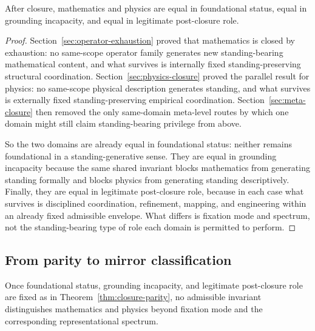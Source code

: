 \begin{theorem}
\label{thm:closure-parity}
After closure, mathematics and physics are equal in foundational status, equal in grounding incapacity, and equal in legitimate post-closure role.
\end{theorem}

\begin{proof}
Section~\ref{sec:operator-exhaustion} proved that mathematics is closed by exhaustion: no same-scope operator family generates new standing-bearing mathematical content, and what survives is internally fixed standing-preserving structural coordination. Section~\ref{sec:physics-closure} proved the parallel result for physics: no same-scope physical description generates standing, and what survives is externally fixed standing-preserving empirical coordination. Section~\ref{sec:meta-closure} then removed the only same-domain meta-level routes by which one domain might still claim standing-bearing privilege from above.

So the two domains are already equal in foundational status: neither remains foundational in a standing-generative sense. They are equal in grounding incapacity because the same shared invariant blocks mathematics from generating standing formally and blocks physics from generating standing descriptively. Finally, they are equal in legitimate post-closure role, because in each case what survives is disciplined coordination, refinement, mapping, and engineering within an already fixed admissible envelope. What differs is fixation mode and spectrum, not the standing-bearing type of role each domain is permitted to perform.
\end{proof}

\subsection{From parity to mirror classification}

\begin{proposition}
\label{prop:no-residual-invariant}
Once foundational status, grounding incapacity, and legitimate post-closure role are fixed as in Theorem~\ref{thm:closure-parity}, no admissible invariant distinguishes mathematics and physics beyond fixation mode and the corresponding representational spectrum.
\end{proposition}


